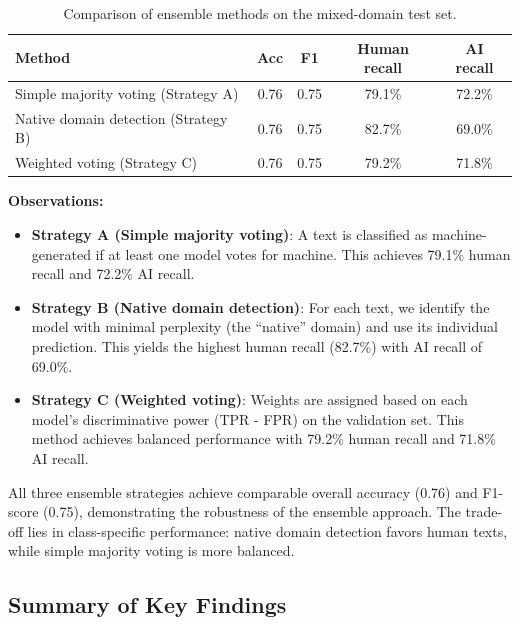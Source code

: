 \documentclass{article}
\begin{document}
\begin{table}[H]
\centering
\caption{Comparison of ensemble methods on the mixed-domain test set.}
\begin{tabular}{|l|c|c|c|c|}
\hline
\textbf{Method} & \textbf{Acc} & \textbf{F1} & \textbf{Human recall} & \textbf{AI recall} \\
\hline
Simple majority voting (Strategy A) & 0.76 & 0.75 & 79.1\% & 72.2\% \\
Native domain detection (Strategy B) & 0.76 & 0.75 & 82.7\% & 69.0\% \\
Weighted voting (Strategy C) & 0.76 & 0.75 & 79.2\% & 71.8\% \\
\hline
\end{tabular}
\label{tab:ensemble}
\end{table}

\noindent
\textbf{Observations:}
\begin{itemize}
    \item \textbf{Strategy A (Simple majority voting)}: A text is classified as machine-generated if at least one model votes for machine. This achieves 79.1\% human recall and 72.2\% AI recall.
    \item \textbf{Strategy B (Native domain detection)}: For each text, we identify the model with minimal perplexity (the ``native'' domain) and use its individual prediction. This yields the highest human recall (82.7\%) with AI recall of 69.0\%.
    \item \textbf{Strategy C (Weighted voting)}: Weights are assigned based on each model's discriminative power (TPR - FPR) on the validation set. This method achieves balanced performance with 79.2\% human recall and 71.8\% AI recall.
\end{itemize}

All three ensemble strategies achieve comparable overall accuracy (0.76) and F1-score (0.75), demonstrating the robustness of the ensemble approach. The trade-off lies in class-specific performance: native domain detection favors human texts, while simple majority voting is more balanced.

\subsection{Summary of Key Findings}
\end{document}
